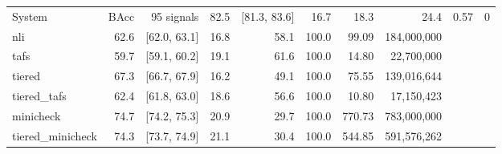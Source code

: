 \begin{tabular}{lrrrrrrr}
\toprule
System & BAcc & 95%
\midrule
signals & 82.5 & [81.3, 83.6] & 16.7 & 18.3 & 24.4 & 0.57 & 0 \\
nli & 62.6 & [62.0, 63.1] & 16.8 & 58.1 & 100.0 & 99.09 & 184,000,000 \\
tafs & 59.7 & [59.1, 60.2] & 19.1 & 61.6 & 100.0 & 14.80 & 22,700,000 \\
tiered & 67.3 & [66.7, 67.9] & 16.2 & 49.1 & 100.0 & 75.55 & 139,016,644 \\
tiered_tafs & 62.4 & [61.8, 63.0] & 18.6 & 56.6 & 100.0 & 10.80 & 17,150,423 \\
minicheck & 74.7 & [74.2, 75.3] & 20.9 & 29.7 & 100.0 & 770.73 & 783,000,000 \\
tiered_minicheck & 74.3 & [73.7, 74.9] & 21.1 & 30.4 & 100.0 & 544.85 & 591,576,262 \\
\bottomrule
\end{tabular}
